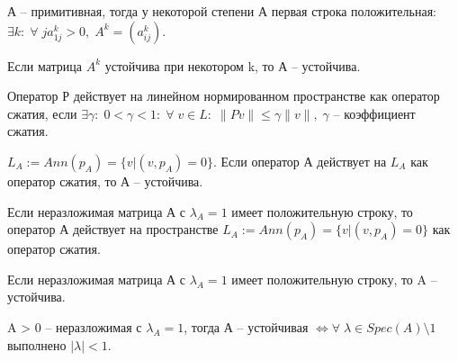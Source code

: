 \begin{lemma}
	А -- примитивная, тогда у некоторой степени А первая строка положительная: $\exists k: \; \forall \; j a_{1j}^k > 0, \; A^k = (a_{ij}^k)$.
\end{lemma}

\begin{lemma}
	Если матрица $A^k$ устойчива при некотором k, то А -- устойчива.
\end{lemma}

\begin{definition}
	Оператор Р действует на линейном нормированном пространстве как оператор сжатия, если $\exists \gamma: \; 0 < \gamma < 1: \; \forall \; v \in L: \; \| Pv\| \leq \gamma \| v\|, \; \gamma $ -- коэффициент сжатия. 
\end{definition}

\begin{lemma}
	$L_A:= Ann(p_A) = \{ v | (v, p_A) = 0\}.$ Если оператор А действует на $L_A$ как оператор сжатия, то А -- устойчива.
\end{lemma}

\begin{lemma}
	Если неразложимая матрица А с $\lambda_A = 1$ имеет положительную строку, то оператор А действует на пространстве $L_A:= Ann(p_A) = \{ v | (v, p_A) = 0\}$ как оператор сжатия.
\end{lemma}

\begin{conseq}
	Если неразложимая матрица А с $\lambda_A = 1$ имеет положительную строку, то A -- устойчива.
\end{conseq}

\begin{theorem}
	A > 0 -- неразложимая с $\lambda_A = 1$, тогда А -- устойчивая $ \Longleftrightarrow \forall \; \lambda \in Spec(A) \setminus 1$ выполнено $|\lambda| < 1.$
\end{theorem}